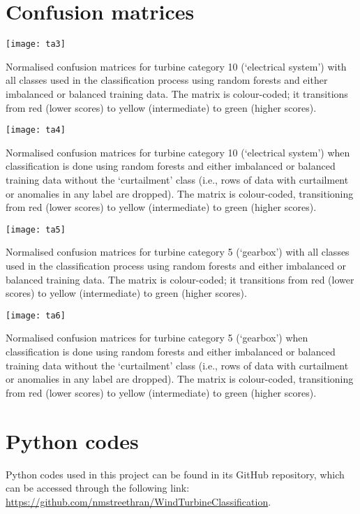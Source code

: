 \chapter{Confusion matrices}\label{a4}

\begin{table}
    \centering
    \texttt{[image: ta3]}
    \captionsetup{labelformat=empty,list=no}
    \caption{Normalised confusion matrices for turbine category 10 (`electrical system') with all classes used in the classification process using random forests and either imbalanced or balanced training data. The matrix is colour-coded; it transitions from red (lower scores) to yellow (intermediate) to green (higher scores).}
\end{table}

\begin{table}
    \centering
    \texttt{[image: ta4]}
    \captionsetup{labelformat=empty,list=no}
    \caption{Normalised confusion matrices for turbine category 10 (`electrical system') when classification is done using random forests and either imbalanced or balanced training data without the `curtailment' class (i.e., rows of data with curtailment or anomalies in any label are dropped). The matrix is colour-coded, transitioning from red (lower scores) to yellow (intermediate) to green (higher scores).}
\end{table}

\begin{table}
    \centering
    \texttt{[image: ta5]}
    \captionsetup{labelformat=empty,list=no}
    \caption{Normalised confusion matrices for turbine category 5 (`gearbox') with all classes used in the classification process using random forests and either imbalanced or balanced training data. The matrix is colour-coded; it transitions from red (lower scores) to yellow (intermediate) to green (higher scores).}
\end{table}

\begin{table}
    \centering
    \texttt{[image: ta6]}
    \captionsetup{labelformat=empty,list=no}
    \caption{Normalised confusion matrices for turbine category 5 (`gearbox') when classification is done using random forests and either imbalanced or balanced training data without the `curtailment' class (i.e., rows of data with curtailment or anomalies in any label are dropped). The matrix is colour-coded, transitioning from red (lower scores) to yellow (intermediate) to green (higher scores).}
\end{table}

\chapter{Python codes}\label{a5}

Python codes used in this project can be found in its GitHub repository, which can be accessed through the following link: \url{https://github.com/nmstreethran/WindTurbineClassification}.
